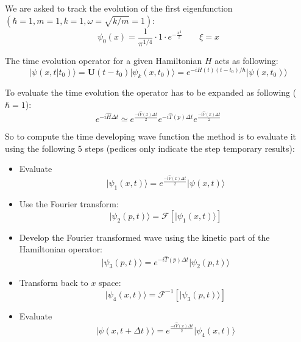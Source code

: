 \documentclass[12pt, a4paper, notitlepage]{report}
\begin{document}
We are asked to track the evolution of the first eigenfunction $ ( \hbar = 1, m=1, k=1, \omega = \sqrt{k/m} = 1 ) $:
\begin{equation}
\psi_0 (x) = \frac{1}{\pi^{1/4}} \cdot 1 \cdot e^{-\frac{x^2}{2}} \qquad \xi = x
\end{equation}

The time evolution operator for a given Hamiltonian $H$ acts as following:
\begin{equation}
\vert \psi (x,t\vert t_0) \rangle = \mathbf{U}(t-t_0) \vert \psi_k (x,t_0) \rangle = e^{ -i H(t) (t-t_0)/\hbar } \vert \psi (x, t_0) \rangle
\end{equation}

To evaluate the time evolution the operator has to be expanded as following ($\hbar = 1$):
\begin{equation}
e^{ -i \hat{H} \Delta t } \simeq e^{ \frac{-i \hat{V}(x) \Delta t}{2} }  e^{ -i \hat{T}(p) \Delta t } e^{ \frac{-i \hat{V}(x) \Delta t}{2}}
\end{equation}

So to compute the time developing wave function the method is to evaluate it using the following 5 steps (pedices only indicate the step temporary results):
\begin{itemize}
	\item Evaluate
	\begin{equation}
		\vert \psi_1 (x,t) \rangle = e^{ \frac{-i \hat{V}(x) \Delta t}{2}} \vert \psi (x,t) \rangle
	\end{equation}
	\item Use the Fourier transform:
	\begin{equation}
		\vert \psi_2 (p,t) \rangle = \mathcal{F} [\vert \psi_1 (x,t) \rangle ]
	\end{equation}
	\item Develop the Fourier transformed wave using the kinetic part of the Hamiltonian operator:
	\begin{equation}
		\vert \psi_3 (p,t) \rangle = e^{ -i \hat{T}(p) \Delta t } \vert \psi_2 (p,t) \rangle
	\end{equation}
	\item Transform back to $x$ space:
	\begin{equation}
	\vert \psi_4 (x,t) \rangle = \mathcal{F}^{-1} [\vert \psi_3 (p,t) \rangle ]
	\end{equation}
	\item Evaluate
	\begin{equation}
	\vert \psi (x, t + \Delta t) \rangle = e^{ \frac{-i \hat{V}(x) \Delta t}{2}} \vert \psi_4 (x,t) \rangle
	\end{equation}
\end{itemize}
\end{document}
